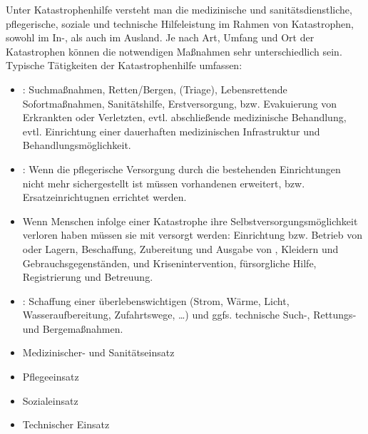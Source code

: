 {%
Unter Katastrophenhilfe versteht man die medizinische und sanitätsdienstliche,
pflegerische, 
soziale und 
technische 
Hilfeleistung im Rahmen von Katastrophen, 
sowohl im In-, als auch im Ausland. 
%
Je nach Art, Umfang und Ort der Katastrophen können die notwendigen Maßnahmen 
sehr unterschiedlich sein.
%
Typische Tätigkeiten der Katastrophenhilfe umfassen:
\begin{itemize}
  \item {}:
  Suchmaßnahmen, 
  Retten/Bergen, 
   (Triage),
  Lebensrettende Sofortmaßnahmen,
  Sanitätshilfe,
  Erstversorgung,
   bzw. Evakuierung von Erkrankten oder Verletzten,
  evtl. abschließende medizinische Behandlung, 
  evtl. Einrichtung einer dauerhaften medizinischen Infrastruktur und 
  Behandlungsmöglichkeit.
  \item {}:
  Wenn die pflegerische Versorgung durch die bestehenden
  Einrichtungen nicht mehr sichergestellt ist 
  müssen vorhandenen  erweitert, 
  bzw. Ersatzeinrichtugnen errichtet werden. 
  \item {}
  Wenn Menschen infolge einer Katastrophe ihre 
  Selbstversorgungsmöglichkeit verloren haben
  müssen sie mit  
  versorgt 
  werden:
  Einrichtung bzw. Betrieb von  oder Lagern,
  Beschaffung, Zubereitung und Ausgabe von , 
  Kleidern
  und Gebrauchsgegenständen, 
   und Krisenintervention,
  fürsorgliche Hilfe, Registrierung und Betreuung.
  \item {}: 
  Schaffung einer überlebenswichtigen  (Strom, Wärme, Licht, 
  Wasseraufbereitung, Zufahrtswege, \ldots)
  und ggfs. technische Such-, Rettungs- und Bergemaßnahmen.
\end{itemize}
}
{%
\begin{itemize}
  \item {Medizinischer- und Sanitätseinsatz}
  \item {Pflegeeinsatz}
  \item {Sozialeinsatz}
  \item {Technischer Einsatz} 
\end{itemize}
}





